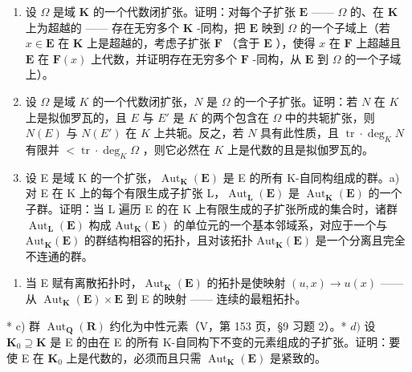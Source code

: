 \begin{enumerate}
\def\labelenumi{\arabic{enumi})}
\setcounter{enumi}{4}
\item
  设 \(\Omega\) 是域 \(\mathbf{K}\) 的一个代数闭扩张。证明：对每个子扩张 \(\mathbf{E}\) —— \(\Omega\) 的、在 \(\mathbf{K}\) 上为超越的 —— 存在无穷多个 \(\mathbf{K}\) -同构，把 \(\mathbf{E}\) 映到 \(\Omega\) 的一个子域上（若 \(x \in \mathbf{E}\) 在 \(\mathbf{K}\) 上是超越的，考虑子扩张 \(\mathbf{F}\) （含于 \(\mathbf{E}\) ），使得 \(x\) 在 \(\mathbf{F}\) 上超越且 \(\mathbf{E}\) 在 \(\mathbf{F}(x)\) 上代数，并证明存在无穷多个 \(\mathbf{F}\) -同构，从 \(\mathbf{E}\) 到 \(\Omega\) 的一个子域上）。
\item
  设 \(\Omega\) 是域 \(K\) 的一个代数闭扩张，\(N\) 是 \(\Omega\) 的一个子扩张。证明：若 \(N\) 在 \(K\) 上是拟伽罗瓦的，且 \(E\) 与 \(E'\) 是 \(K\) 的两个包含在 \(\Omega\) 中的共轭扩张，则 \(N(E)\) 与 \(N(E')\) 在 \(K\) 上共轭。反之，若 \(N\) 具有此性质，且 \(\operatorname{tr} \cdot \deg_{K} N\) 有限并 \(< \operatorname{tr} \cdot \deg_{K} \Omega\) ，则它必然在 \(K\) 上是代数的且是拟伽罗瓦的。
\item
  设 E 是域 K 的一个扩张，\(\operatorname{Aut}_{\mathbf{K}}(\mathbf{E})\) 是 E 的所有 K-自同构组成的群。a) 对 E 在 K 上的每个有限生成子扩张 L，\(\operatorname{Aut}_{\mathbf{L}}(\mathbf{E})\) 是 \(\operatorname{Aut}_{\mathbf{K}}(\mathbf{E})\) 的一个子群。证明：当 L 遍历 E 的在 K 上有限生成的子扩张所成的集合时，诸群 \(\operatorname{Aut}_{\mathbf{L}}(\mathbf{E})\) 构成 \(\mathrm{Aut}_{\mathbf{K}}(\mathbf{E})\) 的单位元的一个基本邻域系，对应于一个与 \(\mathrm{Aut}_{\mathbf{K}}(\mathbf{E})\) 的群结构相容的拓扑，且对该拓扑 \(\mathrm{Aut}_{\mathbf{K}}(\mathbf{E})\) 是一个分离且完全不连通的群。
\end{enumerate}

\begin{enumerate}
\def\labelenumi{\alph{enumi})}
\setcounter{enumi}{1}
\tightlist
\item
  当 E 赋有离散拓扑时，\(\operatorname{Aut}_{\mathbf{K}}(\mathbf{E})\) 的拓扑是使映射 \((u,x)\to u(x)\) —— 从 \(\operatorname{Aut}_{\mathbf{K}}(\mathbf{E})\times\mathbf{E}\) 到 E 的映射 —— 连续的最粗拓扑。
\end{enumerate}

* c) 群 \(\operatorname{Aut}_{\mathbf{Q}}(\mathbf{R})\) 约化为中性元素（V，第 153 页，§9 习题 2）。* \(d)\) 设 \(\mathbf{K}_0 \supseteq \mathbf{K}\) 是 E 的由在 E 的所有 K-自同构下不变的元素组成的子扩张。证明：要使 E 在 \(\mathbf{K}_0\) 上是代数的，必须而且只需 \(\operatorname{Aut}_{\mathbf{K}}(\mathbf{E})\) 是紧致的。

